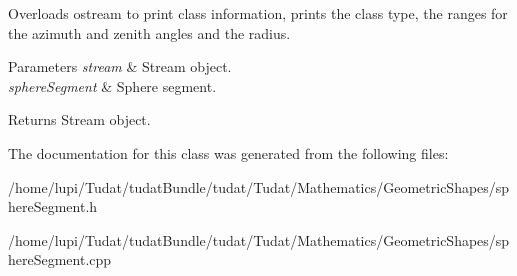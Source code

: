 Overloads ostream to print class information, prints the class type, the ranges for the azimuth and zenith angles and the radius. 
\begin{DoxyParams}{Parameters}
{\em stream} & Stream object. \\
\hline
{\em sphere\+Segment} & Sphere segment. \\
\hline
\end{DoxyParams}
\begin{DoxyReturn}{Returns}
Stream object. 
\end{DoxyReturn}


The documentation for this class was generated from the following files\+:\begin{DoxyCompactItemize}
\item 
/home/lupi/\+Tudat/tudat\+Bundle/tudat/\+Tudat/\+Mathematics/\+Geometric\+Shapes/sphere\+Segment.\+h\item 
/home/lupi/\+Tudat/tudat\+Bundle/tudat/\+Tudat/\+Mathematics/\+Geometric\+Shapes/sphere\+Segment.\+cpp\end{DoxyCompactItemize}
